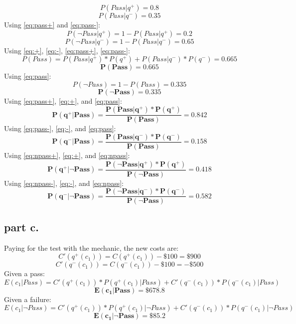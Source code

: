 \begin{equation}
\label{eq:pass+}
	P(Pass | q^+) = 0.8
\end{equation}
\begin{equation}
\label{eq:pass-}
	P(Pass | q^-) = 0.35
\end{equation}
Using \ref{eq:pass+} and \ref{eq:pass-}:
\begin{equation}
\label{eq:npass+}
	P(\neg Pass | q^+) = 1 - P(Pass | q^+) = 0.2
\end{equation}
\begin{equation}
\label{eq:npass-}
	P(\neg Pass | q^-) = 1 - P(Pass | q^-) = 0.65
\end{equation}
Using \ref{eq:+}, \ref{eq:-}, \ref{eq:pass+}, \ref{eq:pass-}:
\[P(Pass) = P(Pass | q^+) * P(q^+) + P(Pass | q^-) * P(q^-) = 0.665\]
\begin{equation}
\label{eq:pass}
	\mathbf{P(Pass) = 0.665}
\end{equation}
Using \ref{eq:pass}:
\[P(\neg Pass) = 1 - P(Pass) = 0.335  \]
\begin{equation}
\label{eq:npass}
	\mathbf{P(\neg Pass) = 0.335}
\end{equation}
Using \ref{eq:pass+}, \ref{eq:+}, and \ref{eq:pass}:
\begin{equation}
	\mathbf{P(q^+ | Pass) = \frac{P(Pass | q^+) * P(q^+)}{P(Pass)}  = 0.842}
\end{equation}
Using \ref{eq:pass-}, \ref{eq:-}, and \ref{eq:pass}:
\begin{equation}
	\mathbf{P(q^- | Pass) = \frac{P(Pass | q^-) * P(q^-)}{P(Pass)}  = 0.158}
\end{equation}
Using \ref{eq:npass+}, \ref{eq:+}, and \ref{eq:npass}:
\begin{equation}
	\mathbf{P(q^+ | \neg Pass) = \frac{P(\neg Pass | q^+) * P(q^+)}{P(\neg Pass)}  = 0.418}
\end{equation}
Using \ref{eq:npass-}, \ref{eq:-}, and \ref{eq:npass}:
\begin{equation}
	\mathbf{P(q^- | \neg Pass) = \frac{P(\neg Pass | q^-) * P(q^-)}{P(\neg Pass)}  = 0.582}
\end{equation}

\subsection{part c.}
Paying for the test with the mechanic, the new costs are:
\[ C'(q^+(c_1)) = C(q^+(c_1)) - \$100 = \$900 \]
\[ C'(q^-(c_1)) = C(q^-(c_1)) - \$100 = -\$500 \]
Given a pass:
\[E(c_1 | Pass) = C'(q^+(c_1))*P(q^+(c_1)|Pass) + C'(q^-(c_1))*P(q^-(c_1)|Pass)\]
\[\mathbf{E(c_1 | Pass) = \$678.8}\]
Given a failure:
\[E(c_1 |\neg Pass) = C'(q^+(c_1))*P(q^+(c_1)|\neg Pass) + C'(q^-(c_1))*P(q^-(c_1)|\neg Pass)\]
\[\mathbf{E(c_1 |\neg Pass) = \$85.2}\]

